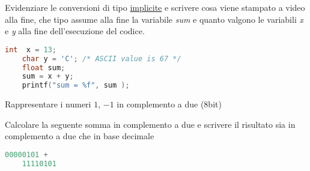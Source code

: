 \documentclass[addpoints,11pt]{exam}
\begin{document}
\boxedpoints
{}
\begin{center}
\end{center}

\vspace{5mm}

\noindent{}



\begin{questions} 

\question[1]
Evidenziare le conversioni di tipo \underline{implicite} e scrivere cosa viene stampato a video alla fine, che tipo assume alla fine la variabile \emph{sum} e quanto valgono le variabili \emph{x} e \emph{y} alla fine dell'esecuzione del codice. 


\begin{minipage}[t]{0.5\linewidth}
	\begin{lstlisting}[language=C]
	int  x = 13;
	char y = 'C'; /* ASCII value is 67 */
	float sum;
	sum = x + y;
	printf("sum = %f", sum );
	\end{lstlisting}
\end{minipage}
\begin{minipage}[t]{0.5\linewidth}
	\makeemptybox{50pt}
\end{minipage}



\question[1]
Rappresentare i numeri $1$, $-1$ in complemento a due (8bit) 

\begin{minipage}[t]{0.5\linewidth}
	
\end{minipage}
\begin{minipage}[t]{0.5\linewidth}
	\makeemptybox{70pt}
\end{minipage}



\question[2]
Calcolare la seguente somma in complemento a due e scrivere il risultato sia in complemento a due che in base decimale

\begin{minipage}[t]{0.5\linewidth}
	\begin{lstlisting}[language=C]
	00000101 +
	11110101\end{lstlisting}
\end{minipage}
\begin{minipage}[t]{0.5\linewidth}
	\makeemptybox{50pt}
\end{minipage}




\end{questions}
\end{document}
